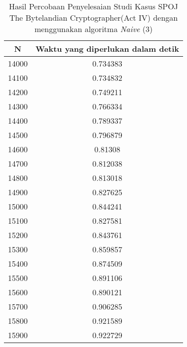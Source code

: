 \begin{table}[H]
\centering
\begin{tabular}{|c|c|}\hline
N&Waktu yang diperlukan dalam detik\\ \hline
14000&0.734383\\ \hline
14100&0.734832\\ \hline
14200&0.749211\\ \hline
14300&0.766334\\ \hline
14400&0.789337\\ \hline
14500&0.796879\\ \hline
14600&0.81308\\ \hline
14700&0.812038\\ \hline
14800&0.813018\\ \hline
14900&0.827625\\ \hline
15000&0.844241\\ \hline
15100&0.827581\\ \hline
15200&0.843761\\ \hline
15300&0.859857\\ \hline
15400&0.874509\\ \hline
15500&0.891106\\ \hline
15600&0.890121\\ \hline
15700&0.906285\\ \hline
15800&0.921589\\ \hline
15900&0.922729\\ \hline
\end{tabular}
\caption {Hasil Percobaan Penyelesaian Studi Kasus SPOJ The Bytelandian Cryptographer(Act IV) dengan menggunakan algoritma \textit{Naive} (3)}
\label{tab1:1res6}
\end{table}
